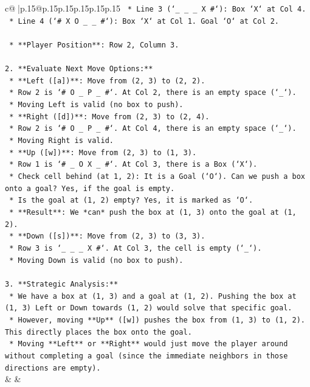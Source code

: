 \documentclass{article}
\begin{document}
{\begin{supertabular}{c@{$\;$}|p{.15\linewidth}@{}p{.15\linewidth}p{.15\linewidth}p{.15\linewidth}p{.15\linewidth}p{.15\linewidth}}
{{{\texttt{        *   Line 3 (`\_ \_ \_ X \#`): Box `X` at Col 4.} \\
\texttt{        *   Line 4 (`\# X O \_ \_ \#`): Box `X` at Col 1. Goal `O` at Col 2.} \\
\\ 
\texttt{    *   **Player Position**: Row 2, Column 3.} \\
\\ 
\texttt{2.  **Evaluate Next Move Options:**} \\
\texttt{    *   **Left ({[}a{]})**: Move from (2, 3) to (2, 2).} \\
\texttt{        *   Row 2 is `\# O \_ P \_ \#`. At Col 2, there is an empty space (`\_`).} \\
\texttt{        *   Moving Left is valid (no box to push).} \\
\texttt{    *   **Right ({[}d{]})**: Move from (2, 3) to (2, 4).} \\
\texttt{        *   Row 2 is `\# O \_ P \_ \#`. At Col 4, there is an empty space (`\_`).} \\
\texttt{        *   Moving Right is valid.} \\
\texttt{    *   **Up ({[}w{]})**: Move from (2, 3) to (1, 3).} \\
\texttt{        *   Row 1 is `\# \_ O X \_ \#`. At Col 3, there is a Box (`X`).} \\
\texttt{        *   Check cell behind (at 1, 2): It is a Goal (`O`). Can we push a box onto a goal? Yes, if the goal is empty.} \\
\texttt{        *   Is the goal at (1, 2) empty? Yes, it is marked as `O`.} \\
\texttt{        *   **Result**: We *can* push the box at (1, 3) onto the goal at (1, 2).} \\
\texttt{    *   **Down ({[}s{]})**: Move from (2, 3) to (3, 3).} \\
\texttt{        *   Row 3 is `\_ \_ \_ X \#`. At Col 3, the cell is empty (`\_`).} \\
\texttt{        *   Moving Down is valid (no box to push).} \\
\\ 
\texttt{3.  **Strategic Analysis:**} \\
\texttt{    *   We have a box at (1, 3) and a goal at (1, 2). Pushing the box at (1, 3) Left or Down towards (1, 2) would solve that specific goal.} \\
\texttt{    *   However, moving **Up** ({[}w{]}) pushes the box from (1, 3) to (1, 2). This directly places the box onto the goal.} \\
\texttt{    *   Moving **Left** or **Right** would just move the player around without completing a goal (since the immediate neighbors in those directions are empty).} \\
            }
        }
    }
    & & \\ \\


\end{supertabular}}
\end{document}
